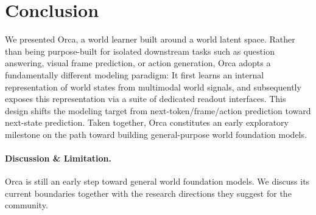 \vspace{-1.5em}
\section{Conclusion}
\label{sec:conclusion}
We presented Orca, a world learner built around a world latent space. 
Rather than being purpose-built for isolated downstream tasks such as question answering, visual frame prediction, or action generation, Orca adopts a fundamentally different modeling paradigm:
It first learns an internal representation of world states from multimodal world signals, and subsequently exposes this representation via a suite of dedicated readout interfaces.
This design shifts the modeling target from next-token/frame/action prediction toward next-state prediction. 
Taken together, Orca constitutes an early exploratory milestone on the path toward building general-purpose world foundation models.

\vspace{-0.5em}
\paragraph{Discussion \& Limitation.}
Orca is still an early step toward general world foundation models. We discuss its current boundaries together with the research directions they suggest for the community.


